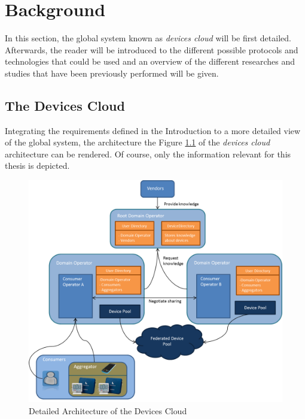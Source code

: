 \chapter{Background}
\label{cha:relatedwork}

In this section, the global system known as \emph{devices cloud} will be first detailed. Afterwards, the reader will be introduced to the different possible protocols and technologies that could be used and an overview of the different researches and studies that have been previously performed will be given.
 
\section{The Devices Cloud}
Integrating the requirements defined in the Introduction to a more detailed view of the global system, the architecture the Figure \ref{fig:design_complete} of the \emph{devices cloud} architecture can be rendered. Of course, only the information relevant for this thesis is depicted.

\begin{figure}[!ht]
	\centering
	\includegraphics[scale=0.3]{images/design_complete}
	\caption{Detailed Architecture of the Devices Cloud}
	\label{fig:design_complete}
\end{figure}

